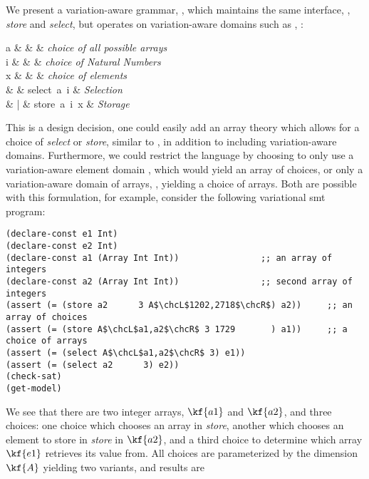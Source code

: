 We present a variation-aware grammar, , which maintains the same
interface, \ie{}, \emph{store} and \emph{select}, but operates on variation-aware
domains such as \lift{\nats}, :
%
\begin{syntax}
  a & \in{} &  & \textit{choice of all possible arrays} \\
  i & \in{} & \lift{\nats} & \textit{choice of Natural Numbers} \\
  x & \in{} &  & \textit{choice of elements} \\[1.5ex]

   & \Coloneqq{} & select\ a\ i    & \textit{Selection} \\
    & | & store\ a\ i\ x & \textit{Storage} \\
\end{syntax}
%
This is a design decision, one could easily add an array theory which allows for
a choice of \emph{select} or \emph{store}, similar to , in addition to
including variation-aware domains. Furthermore, we could restrict the language
by choosing to only use a variation-aware element domain , which would
yield an array of choices, or only a variation-aware domain of arrays,
, yielding a choice of arrays. Both are possible with
this formulation, for example, consider the following variational \ac{smt}
program:
%
\begin{lstlisting}[columns=flexible,keepspaces=true]
(declare-const e1 Int)
(declare-const e2 Int)
(declare-const a1 (Array Int Int))                ;; an array of integers
(declare-const a2 (Array Int Int))                ;; second array of integers
(assert (= (store a2      3 A$\chcL$1202,2718$\chcR$) a2))     ;; an array of choices
(assert (= (store A$\chcL$a1,a2$\chcR$ 3 1729       ) a1))     ;; a choice of arrays
(assert (= (select A$\chcL$a1,a2$\chcR$ 3) e1))
(assert (= (select a2      3) e2))
(check-sat)
(get-model)
\end{lstlisting}
%
We see that there are two integer arrays, $\kf{a1}$ and $\kf{a2}$, and three
choices: one choice which chooses an array in \emph{store}, another which
chooses an element to store in \emph{store} in $\kf{a2}$, and a third choice to
determine which array $\kf{e1}$ retrieves its value from. All choices are
parameterized by the dimension $\kf{A}$ yielding two variants, and results are
